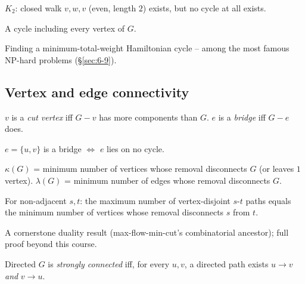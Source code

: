 \documentclass[11pt]{article}
\begin{document}
\begin{note}
$K_2$: closed walk $v,w,v$ (even, length $2$) exists, but no cycle at all exists.
\end{note}

\begin{definition}
A cycle including every vertex of $G$.
\end{definition}

\begin{note}
Finding a minimum-total-weight Hamiltonian cycle -- among the most famous NP-hard problems (\S\ref{sec:6-9}).
\end{note}

\subsection{Vertex and edge connectivity}
\label{sec:11-9-3}

\begin{definition}
$v$ is a \emph{cut vertex} iff $G-v$ has more components than $G$. $e$ is a \emph{bridge} iff $G-e$ does.
\end{definition}

\begin{theorem}
$e=\{u,v\}$ is a bridge $\iff$ $e$ lies on no cycle.
\end{theorem}

\begin{definition}
$\kappa(G)$ = minimum number of vertices whose removal disconnects $G$ (or leaves $1$ vertex). $\lambda(G)$ = minimum number of edges whose removal disconnects $G$.
\end{definition}

\begin{theorem}
For non-adjacent $s,t$: the maximum number of vertex-disjoint $s$-$t$ paths equals the minimum number of vertices whose removal disconnects $s$ from $t$.
\end{theorem}
\begin{note}
A cornerstone duality result (max-flow-min-cut's combinatorial ancestor); full proof beyond this course.
\end{note}

\bigskip
\begin{definition}
Directed $G$ is \emph{strongly connected} iff, for every $u,v$, a directed path exists $u\to v$ \emph{and} $v\to u$.
\end{definition}
\end{document}
